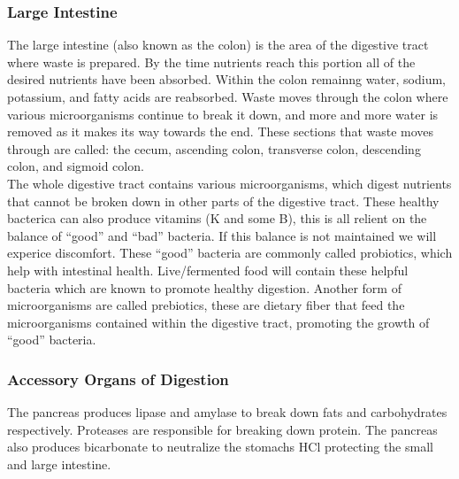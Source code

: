 \documentclass[letterpaper, 11pt]{article}
\begin{document}
\subsubsection{Large Intestine}
\label{sec:orgb2df962}
The large intestine (also known as the colon) is the area of the digestive tract where waste is prepared. By the time nutrients reach this portion all of the desired nutrients have been absorbed. Within the colon remainng water, sodium, potassium, and fatty acids are reabsorbed. Waste moves through the colon where various microorganisms continue to break it down, and more and more water is removed as it makes its way towards the end. These sections that waste moves through are called: the cecum, ascending colon, transverse colon, descending colon, and sigmoid colon.\\
The whole digestive tract contains various microorganisms, which digest nutrients that cannot be broken down in other parts of the digestive tract. These healthy bacterica can also produce vitamins (K and some B), this is all relient on the balance of ``good'' and ``bad'' bacteria. If this balance is not maintained we will experice discomfort. These ``good'' bacteria are commonly called probiotics, which help with intestinal health. Live/fermented food will contain these helpful bacteria which are known to promote healthy digestion. Another form of microorganisms are called prebiotics, these are dietary fiber that feed the microorganisms contained within the digestive tract, promoting the growth of ``good'' bacteria.\\
\subsubsection{Accessory Organs of Digestion}
\label{sec:orgd3abcee}
The pancreas produces lipase and amylase to break down fats and carbohydrates respectively. Proteases are responsible for breaking down protein. The pancreas also produces bicarbonate to neutralize the stomachs HCl protecting the small and large intestine.\\
\end{document}
